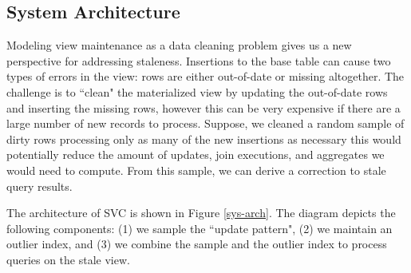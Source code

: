 








\subsection{System Architecture}
Modeling view maintenance as a data cleaning problem gives us a new perspective for addressing staleness.
Insertions to the base table can cause two types of errors in the view: rows are either out-of-date or missing altogether.
The challenge is to ``clean" the materialized view by updating the out-of-date rows and inserting the missing rows, however this can be very expensive if there are a large number of new records to process.
Suppose, we cleaned a random sample of dirty rows processing only as many of the new insertions as necessary this would potentially reduce the amount of updates, join executions, and aggregates we would need to compute.
From this sample, we can derive a correction to stale query results.

The architecture of SVC is shown in Figure \ref{sys-arch}.
The diagram depicts the following components: (1) we sample the ``update pattern",
(2) we maintain an outlier index, and (3) we combine the sample and the outlier index to process queries on the stale view.

